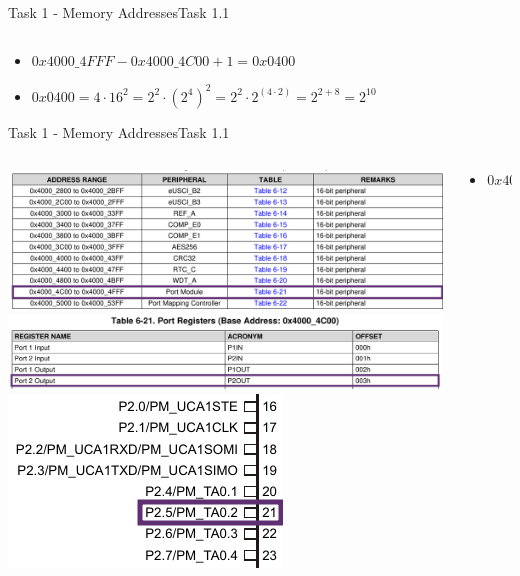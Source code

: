 \begin{frame}{Task 1 - Memory Addresses}{Task 1.1}
\begin{solution}
\begin{columns}
\begin{column}{0.6\textwidth}
      \end{column}
    \end{columns}
    \begin{itemize}
      \item $0x4000\_4FFF - 0x4000\_4C00 + 1 = 0x0400$
      \item $0x0400 = 4 \cdot 16^2 = 2^2 \cdot {(2^4)}^2 = 2^2 \cdot 2^{(4\cdot 2)} = 2^{2+8} = 2^{10}$
    \end{itemize}
  \end{solution}
\end{frame}

\begin{frame}[allowframebreaks]{Task 1 - Memory Addresses}{Task 1.1}
  \begin{solution}
    \begin{columns}
      \begin{column}{0.4\paperwidth}
        \centering
        \includegraphics[width=0.3\paperwidth]{./figures/port_module.png}
        \includegraphics[width=0.3\paperwidth]{./figures/port2.png}
        \includegraphics[height=0.2\paperheight]{./figures/2_5.png}
      \end{column}
      \begin{column}{0.6\paperwidth}
        \begin{itemize}
          \item $0x4000\_4C00 + 0x0003 = 0x4000\_4C03$

\end{itemize}
\end{column}
\end{columns}
\end{solution}
\end{frame}
